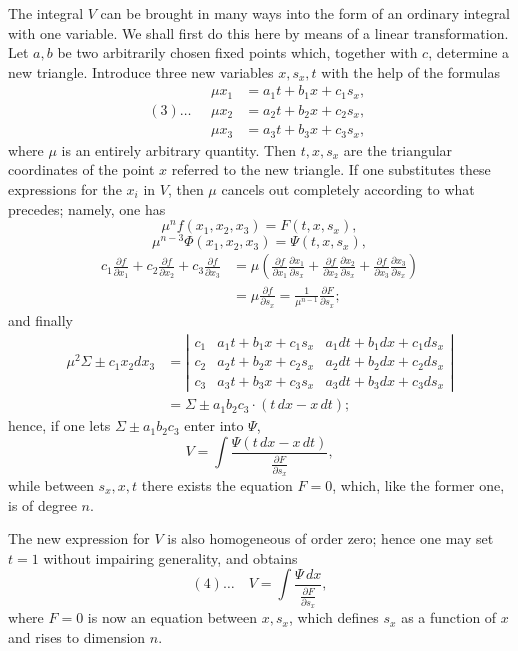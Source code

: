 \documentclass[10pt]{article}
\begin{document}
The integral $V$ can be brought in many ways into the form of an ordinary integral with one variable. We shall first do this here by means of a linear transformation. Let $a,b$ be two arbitrarily chosen fixed points which, together with $c$, determine a new triangle. Introduce three new variables $x,s_x,t$ with the help of the formulas
\[
(3)\ldots\quad
\begin{aligned}
\mu x_1&=a_1t+b_1x+c_1s_x,\\
\mu x_2&=a_2t+b_2x+c_2s_x,\\
\mu x_3&=a_3t+b_3x+c_3s_x,
\end{aligned}
\]
where $\mu$ is an entirely arbitrary quantity. Then $t,x,s_x$ are the triangular coordinates of the point $x$ referred to the new triangle. If one substitutes these expressions for the $x_i$ in $V$, then $\mu$ cancels out completely according to what precedes; namely, one has
\[
\mu^n f(x_1,x_2,x_3)=F(t,x,s_x),
\]
\[
\mu^{n-3}\Phi(x_1,x_2,x_3)=\Psi(t,x,s_x),
\]
\[
\begin{aligned}
c_1\frac{\partial f}{\partial x_1}+c_2\frac{\partial f}{\partial x_2}+c_3\frac{\partial f}{\partial x_3}
&=\mu\left(\frac{\partial f}{\partial x_1}\frac{\partial x_1}{\partial s_x}+\frac{\partial f}{\partial x_2}\frac{\partial x_2}{\partial s_x}+\frac{\partial f}{\partial x_3}\frac{\partial x_3}{\partial s_x}\right)\\
&=\mu\frac{\partial f}{\partial s_x}=\frac{1}{\mu^{n-1}}\frac{\partial F}{\partial s_x};
\end{aligned}
\]
and finally
\[
\begin{aligned}
\mu^2\Sigma\pm c_1x_2dx_3&=\left|\begin{array}{ccc}
c_1&a_1t+b_1x+c_1s_x&a_1dt+b_1dx+c_1ds_x\\
c_2&a_2t+b_2x+c_2s_x&a_2dt+b_2dx+c_2ds_x\\
c_3&a_3t+b_3x+c_3s_x&a_3dt+b_3dx+c_3ds_x
\end{array}\right|\\
&=\Sigma\pm a_1b_2c_3\cdot(t\,dx-x\,dt);
\end{aligned}
\]
hence, if one lets $\Sigma\pm a_1b_2c_3$ enter into $\Psi$,
\[
V=\int\frac{\Psi(t\,dx-x\,dt)}{\frac{\partial F}{\partial s_x}},
\]
while between $s_x,x,t$ there exists the equation $F=0$, which, like the former one, is of degree $n$.

The new expression for $V$ is also homogeneous of order zero; hence one may set $t=1$ without impairing generality, and obtains
\[
(4)\ldots\quad V=\int\frac{\Psi\,dx}{\frac{\partial F}{\partial s_x}},
\]
where $F=0$ is now an equation between $x,s_x$, which defines $s_x$ as a function of $x$ and rises to dimension $n$.
\end{document}
